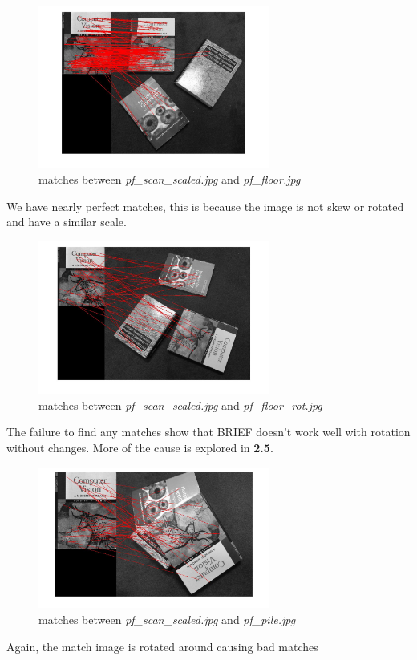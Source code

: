 \documentclass{article}
\begin{document}
\begin{figure}[H]
    \centering
    \includegraphics[width=3.0in]{q2-4-1-floor}
    \caption{matches between \textit{pf\_scan\_scaled.jpg} and \textit{pf\_floor.jpg}}
\end{figure}
We have nearly perfect matches, this is because the image is not skew or rotated and have a similar scale.
\begin{figure}[H]
    \centering
    \includegraphics[width=3.0in]{q2-4-1-floor_rot}
    \caption{matches between \textit{pf\_scan\_scaled.jpg} and \textit{pf\_floor\_rot.jpg}}
\end{figure}
The failure to find any matches show that BRIEF doesn't work well with rotation without changes. More of the cause is explored in \textbf{2.5}.
\begin{figure}[H]
    \centering
    \includegraphics[width=3.0in]{q2-4-1-pile}
    \caption{matches between \textit{pf\_scan\_scaled.jpg} and \textit{pf\_pile.jpg}}
\end{figure}
Again, the match image is rotated around causing bad matches
\end{document}
